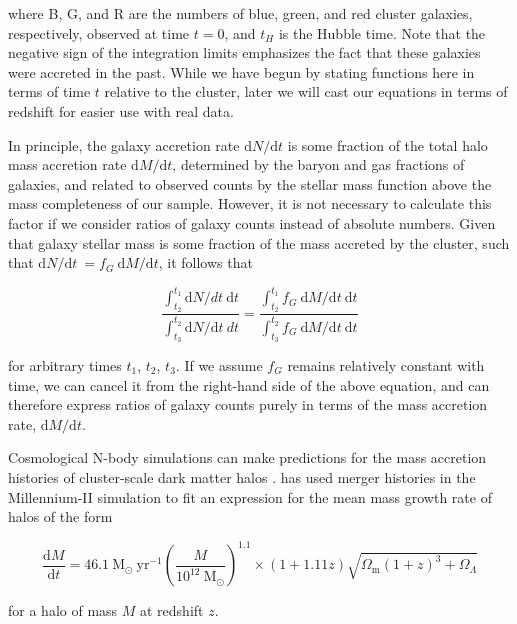 where B, G, and R are the numbers of blue, green, and red cluster galaxies, respectively, observed at time $t=0$, and $t_H$ is the Hubble time.
Note that the negative sign of the integration limits emphasizes the fact that these galaxies were accreted in the past.
While we have begun by stating functions here in terms of time $t$ relative to the cluster, later we will cast our equations in terms of redshift for easier use with real data.

In principle, the galaxy accretion rate $\mathrm{d}N/\mathrm{d}t$ is some fraction of the total halo mass accretion rate $\mathrm{d}M/\mathrm{d}t$, determined by the baryon and gas fractions of galaxies, and related to observed counts by the stellar mass function above the mass completeness of our sample.
However, it is not necessary to calculate this factor if we consider ratios of galaxy counts instead of absolute numbers.
Given that galaxy stellar mass is some fraction of the mass accreted by the cluster, such that $\mathrm{d}N/\mathrm{d}t\ = f_G\ \mathrm{d}M/\mathrm{d}t$, it follows that

\begin{equation*}
\frac{\displaystyle\int_{t_2}^{t_1} \mathrm{d}N/dt\ \mathrm{d}t}{\displaystyle\int_{t_3}^{t_2} \mathrm{d}N/\mathrm{d}t\ dt} = \frac{\displaystyle\int_{t_2}^{t_1} f_G\ \mathrm{d}M/\mathrm{d}t\ \mathrm{d}t}{\displaystyle\int_{t_3}^{t_2} f_G\ \mathrm{d}M/\mathrm{d}t\ \mathrm{d}t}
\end{equation*}

for arbitrary times $t_1$, $t_2$, $t_3$.
If we assume $f_G$ remains relatively constant with time, we can cancel it from the right-hand side of the above equation, and can therefore express ratios of galaxy counts purely in terms of the mass accretion rate, $\mathrm{d}M/\mathrm{d}t$.

Cosmological N-body simulations can make predictions for the mass accretion histories of cluster-scale dark matter halos \citep{Lacey:1993aa}.
\citet{Fakhouri:2010aa} has used merger histories in the Millennium-\textsc{II} simulation to fit an expression for the mean mass growth rate of halos of the form

\begin{equation*}
\frac{\mathrm{d}M}{\mathrm{d}t} = 46.1\ \mathrm{M_\odot\ yr^{-1}} \left(\frac{M}{10^{12}\ \mathrm{M_\odot}}\right)^{1.1}\times(1+1.11z)\sqrt{\Omega_{\mathrm{m}}(1+z)^3 + \Omega_{\Lambda}}
\end{equation*}

for a halo of mass $M$ at redshift $z$.

